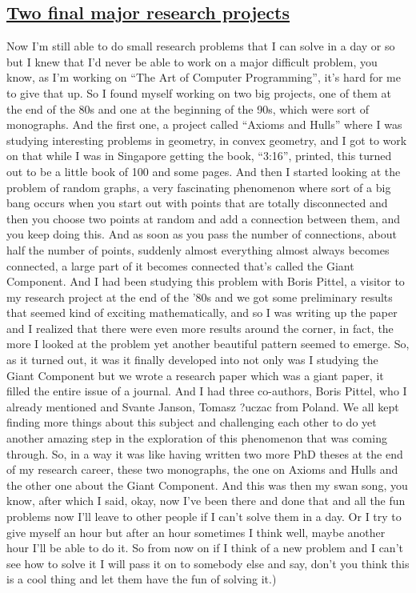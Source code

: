 \documentclass[]{article}
\begin{document}
\subsection{\texorpdfstring{\href{http://webofstories.com/play/17142}{Two
final major research
projects}}{Two final major research projects}}\label{two-final-major-research-projects}

Now I'm still able to do small research problems that I can solve in a
day or so but I knew that I'd never be able to work on a major difficult
problem, you know, as I'm working on ``The Art of Computer
Programming'', it's hard for me to give that up. So I found myself
working on two big projects, one of them at the end of the 80s and one
at the beginning of the 90s, which were sort of monographs. And the
first one, a project called ``Axioms and Hulls'' where I was studying
interesting problems in geometry, in convex geometry, and I got to work
on that while I was in Singapore getting the book, ``3:16'', printed,
this turned out to be a little book of 100 and some pages. And then I
started looking at the problem of random graphs, a very fascinating
phenomenon where sort of a big bang occurs when you start out with
points that are totally disconnected and then you choose two points at
random and add a connection between them, and you keep doing this. And
as soon as you pass the number of connections, about half the number of
points, suddenly almost everything almost always becomes connected, a
large part of it becomes connected that's called the Giant Component.
And I had been studying this problem with Boris Pittel, a visitor to my
research project at the end of the '80s and we got some preliminary
results that seemed kind of exciting mathematically, and so I was
writing up the paper and I realized that there were even more results
around the corner, in fact, the more I looked at the problem yet another
beautiful pattern seemed to emerge. So, as it turned out, it was it
finally developed into not only was I studying the Giant Component but
we wrote a research paper which was a giant paper, it filled the entire
issue of a journal. And I had three co-authors, Boris Pittel, who I
already mentioned and Svante Janson, Tomasz ?uczac from Poland. We all
kept finding more things about this subject and challenging each other
to do yet another amazing step in the exploration of this phenomenon
that was coming through. So, in a way it was like having written two
more PhD theses at the end of my research career, these two monographs,
the one on Axioms and Hulls and the other one about the Giant Component.
And this was then my swan song, you know, after which I said, okay, now
I've been there and done that and all the fun problems now I'll leave to
other people if I can't solve them in a day. Or I try to give myself an
hour but after an hour sometimes I think well, maybe another hour I'll
be able to do it. So from now on if I think of a new problem and I can't
see how to solve it I will pass it on to somebody else and say, don't
you think this is a cool thing and let them have the fun of solving it.)
\end{document}
